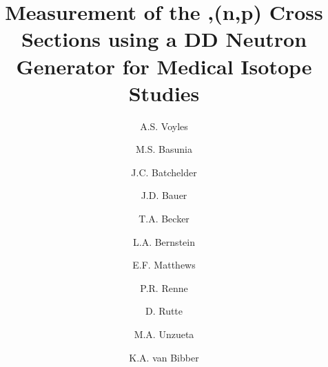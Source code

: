 \documentclass[5p]{elsarticle}
\begin{document}
\begin{frontmatter}


\title{Measurement of the ,(n,p) Cross Sections using a DD Neutron Generator for Medical Isotope Studies}




\author[ucb]{A.S. Voyles }

\author[lbl]{M.S. Basunia}

\author[ucb]{J.C. Batchelder}

\author[llnl]{J.D. Bauer}

\author[geo]{T.A. Becker}


\author[ucb,lbl]{L.A. Bernstein}


\author[ucb]{E.F. Matthews}

\author[geo,eps]{P.R. Renne}

\author[geo,eps]{D. Rutte}

\author[ucb]{M.A. Unzueta}

\author[ucb]{K.A. van Bibber}








\end{frontmatter}
\end{document}

